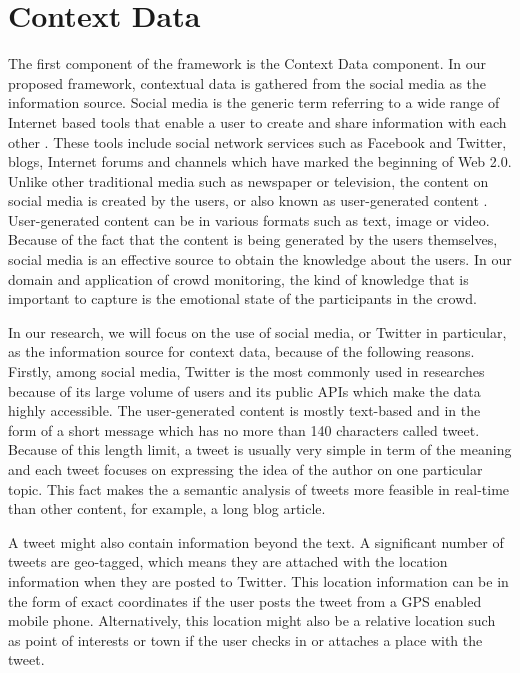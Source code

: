 \section{Context Data}
The first component of the framework is the Context Data component. In our proposed framework, contextual data is gathered from the social media as the information source. Social media is the generic term referring to a wide range of Internet based tools that enable a user to create and share information with each other \citep{kaplan2010users}. These tools include social network services such as Facebook and Twitter, blogs, Internet forums and channels which have marked the beginning of Web 2.0. Unlike other traditional media such as newspaper or television, the content on social media is created by the users, or also known as user-generated content \citep{kaplan2010users}. User-generated content can be in various formats such as text, image or video. Because of the fact that the content is being generated by the users themselves, social media is an effective source to obtain the knowledge about the users. In our domain and application of crowd monitoring, the kind of knowledge that is important to capture is the emotional state of the participants in the crowd. 

In our research, we will focus on the use of social media, or Twitter in particular, as the information source for context data, because of the following reasons. Firstly, among social media, Twitter is the most commonly used in researches because of its large volume of users and its public APIs which make the data highly accessible. The user-generated content is mostly text-based and in the form of a short message which has no more than 140 characters called tweet. Because of this length limit, a tweet is usually very simple in term of the meaning and each tweet focuses on expressing the idea of the author on one particular topic. This fact makes the a semantic analysis of tweets more feasible in real-time than other content, for example, a long blog article.

A tweet might also contain information beyond the text. A significant number of tweets are geo-tagged, which means they are attached with the location information when they are posted to Twitter. This location information can be in the form of exact coordinates if the user posts the tweet from a GPS enabled mobile phone. Alternatively, this location might also be a relative location such as point of interests or town if the user checks in or attaches a place with the tweet.

